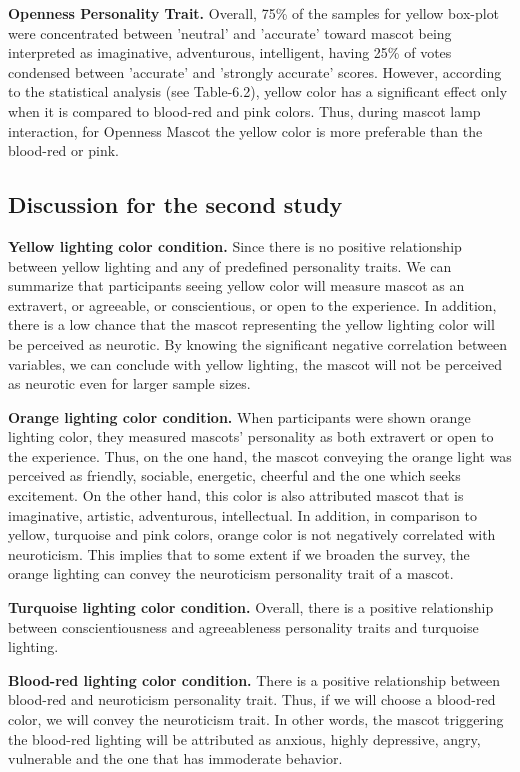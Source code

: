 \par \textbf{Openness Personality Trait.} Overall, 75\% of the samples for yellow box-plot were concentrated between 'neutral' and 'accurate' toward mascot being interpreted as imaginative, adventurous, intelligent, having 25\% of votes condensed between 'accurate' and 'strongly accurate' scores. However, according to the statistical analysis (see Table-6.2), yellow color has a significant effect only when it is compared to blood-red and pink colors. Thus, during mascot lamp interaction, for Openness Mascot the yellow color is more preferable than the blood-red or pink. 

\subsection{Discussion for the second study}
\par \textbf{Yellow lighting color condition.} Since there is no positive relationship between yellow lighting and any of predefined personality traits. We can summarize that participants seeing yellow color will measure mascot as an extravert, or agreeable, or conscientious, or open to the experience. In addition, there is a low chance that the mascot representing the yellow lighting color will be perceived as neurotic. By knowing the significant negative correlation between variables, we can conclude with yellow lighting, the mascot will not be perceived as neurotic even for larger sample sizes.
\par \textbf{Orange lighting color condition.} When participants were shown orange lighting color, they measured mascots’ personality as both extravert or open to the experience. Thus, on the one hand, the mascot conveying the orange light was perceived as friendly, sociable, energetic, cheerful and the one which seeks excitement. On the other hand, this color is also attributed mascot that is imaginative, artistic, adventurous, intellectual. In addition, in comparison to yellow, turquoise and pink colors, orange color is not negatively correlated with neuroticism. This implies that to some extent if we broaden the survey, the orange lighting can convey the neuroticism personality trait of a mascot.
\par \textbf{Turquoise lighting color condition.} Overall, there is a positive relationship between conscientiousness and agreeableness personality traits and turquoise lighting. 
\par \textbf{Blood-red lighting color condition.} There is a positive relationship between blood-red and neuroticism personality trait. Thus, if we will choose a blood-red color, we will convey the neuroticism trait. In other words, the mascot triggering the blood-red lighting will be attributed as anxious, highly depressive, angry, vulnerable and the one that has immoderate behavior.
